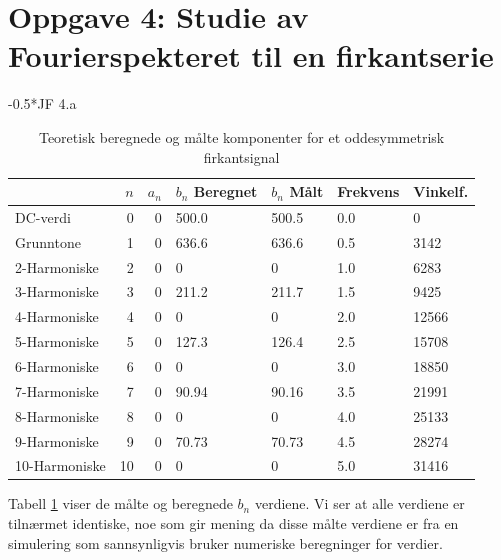 \documentclass[norsk, a4paper]{article}
\makeatletter
\renewcommand{\subsubsection}{\@startsection{subsubsection}{3}{-2cm}%
{-\baselineskip}{0.5\baselineskip}{\bf\large}}
\newcommand{\jf}[1]{\subsubsection*{JF #1}\vspace*{-2\baselineskip}}
\makeatother
\begin{document}
\section{Oppgave 4: Studie av Fourierspekteret til en firkantserie}
\jf{4.a}
\begin{table}[H]
  \centering
  \begin{tabular}{ l r r p{2cm} p{1.3cm} p{1.4cm} p{1.4cm} }
    \toprule
    & $n$ & $a_n$ & \centering $b_n$ Beregnet \par [mV] & $b_n$ Målt \par [mV] &
    Frekvens \par [kHz] & Vinkelf. \par [rad/s] \\
    \midrule
     DC-verdi     &  0 & 0 & 500.0 & 500.5 & 0.0   & 0 \\
     Grunntone    &  1 & 0 & 636.6 & 636.6 & 0.5   & 3142 \\
     2-Harmoniske &  2 & 0 & 0     & 0     & 1.0   & 6283 \\
     3-Harmoniske &  3 & 0 & 211.2 & 211.7 & 1.5   & 9425 \\
     4-Harmoniske &  4 & 0 & 0 	   & 0 	   & 2.0   & 12566 \\
     5-Harmoniske &  5 & 0 & 127.3 & 126.4 & 2.5   & 15708 \\
     6-Harmoniske &  6 & 0 & 0 	   & 0 	   & 3.0   & 18850 \\
     7-Harmoniske &  7 & 0 & 90.94 & 90.16 & 3.5   & 21991 \\
     8-Harmoniske &  8 & 0 & 0     & 0     & 4.0   & 25133 \\
     9-Harmoniske &  9 & 0 & 70.73 & 70.73 & 4.5   & 28274 \\
    10-Harmoniske & 10 & 0 & 0     & 0     & 5.0   & 31416 \\
    \bottomrule
  \end{tabular}
  \caption{Teoretisk beregnede og målte komponenter for et oddesymmetrisk
  firkantsignal}
  \label{tab:komponenter_firkant}
\end{table}

Tabell \ref{tab:komponenter_firkant} viser de målte og beregnede \(b_n\) verdiene. Vi ser at alle verdiene er tilnærmet identiske, noe som gir mening da disse målte verdiene er fra en simulering som sannsynligvis bruker numeriske beregninger for verdier.
\end{document}
